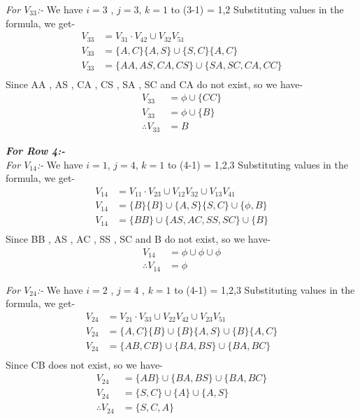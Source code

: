 \documentclass[12pt]{book}
\begin{document}
\textit{For $V_{33}$:-}\newline
We have $i = 3$ , $j = 3$, $k = 1$ to (3-1) = 1,2\newline
Substituting values in the formula, we get-
\begin{align*}
V_{33} &= V_{31} \cdot V_{42} \cup V_{32} V_{51}\\
V_{33} &= \{ A, C \} \{ A, S \} \cup \{ S, C \} \{ A, C \}\\
V_{33} &= \{AA, AS, CA, CS\} \cup \{ SA, SC, CA, CC \}\\
\end{align*}
Since AA , AS , CA , CS , SA , SC and CA do not exist, so we have-
\begin{align*}
V_{33} &= \phi \cup \{ CC \}\\
V_{33} &= \phi \cup \{ B\}\\
\therefore V_{33} &= B
\end{align*}

\textbf{\textit{For Row 4:-}}\\
\textit{For $V_{14}$:-}\newline
We have $i = 1$, $j = 4$, $k = 1$ to (4-1) = 1,2,3\newline
Substituting values in the formula, we get-
\begin{align*}
V_{14} &= V_{11} \cdot V_{23} \cup V_{12} V_{32} \cup V_{13} V_{41}\\
V_{14} &= \{ B \} \{ B \} \cup \{ A, S \} \{ S, C \} \cup \{ \phi, B \}\\
V_{14} &= \{ BB \} \cup \{AS, AC, SS, SC\} \cup \{ B \}\\
\end{align*}
Since BB , AS , AC , SS , SC and B do not exist, so we have-
\begin{align*}
V_{14} &= \phi \cup \phi \cup \phi\\
\therefore V_{14} &= \phi
\end{align*}

\textit{For $V_{24}$:-}\newline
We have $i = 2$ , $j = 4$ , $k = 1$ to (4-1) = 1,2,3\newline
Substituting values in the formula, we get-
\begin{align*}
V_{24} &= V_{21} \cdot V_{33} \cup V_{22} V_{42} \cup V_{23} V_{51}\\
V_{24} &= \{ A, C\} \{ B \} \cup \{ B \} \{ A, S \} \cup \{ B \} \{ A, C \}\\
V_{24} &= \{ AB, CB \} \cup \{BA, BS\} \cup \{ BA, BC \}\\
\end{align*}
Since CB does not exist, so we have-
\begin{align*}
V_{24} &= \{ AB \} \cup \{BA, BS\} \cup \{ BA, BC \}\\
V_{24} &= \{ S, C \} \cup \{A\} \cup \{ A, S \}\\
\therefore V_{24} &= \{ S, C, A \}
\end{align*}
\end{document}
